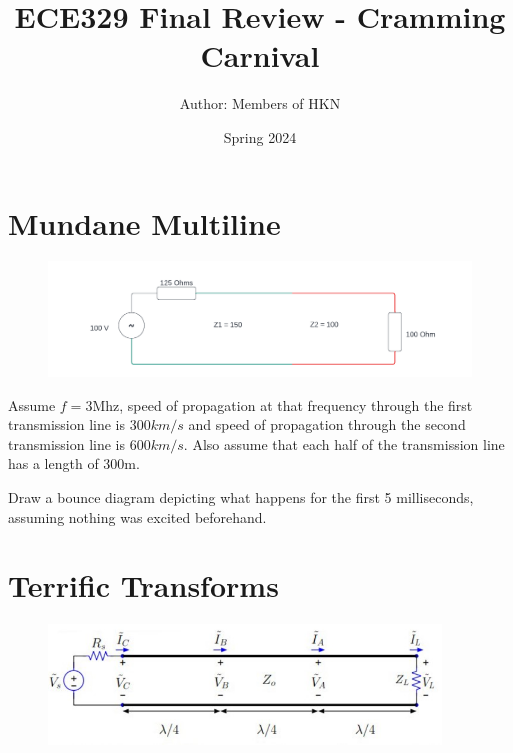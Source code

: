 \documentclass{article}
\title{ECE329 Final Review - Cramming Carnival}
\author{Author: Members of HKN}
\date{Spring 2024}
\begin{document}
\maketitle

\section{Mundane Multiline}

\begin{figure}[h]
\begin{center}
    \includegraphics[width=
    \textwidth]{figures/Multiline_Example.png}
\end{center}
\end{figure}

Assume $f = 3$Mhz, speed of propagation at that frequency through the first transmission line is $300 km/s$ and speed of propagation through the second transmission line is $600 km/s$. Also assume that each half of the transmission line has a length of 300m.

Draw a bounce diagram depicting what happens for the first 5 milliseconds, assuming nothing was excited beforehand.

\newpage

\section{Terrific Transforms}

\begin{figure}[H]
\begin{center}
    \includegraphics[width=0.93\textwidth]{figures/329 Problem 2.jpg}
\end{center}
\end{figure}
\end{document}
